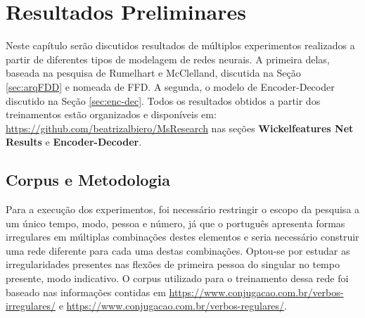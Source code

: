 \chapter{Resultados Preliminares}
\label{ch:03-results}


Neste capítulo serão discutidos resultados de múltiplos experimentos realizados a partir de diferentes tipos de modelagem de redes neurais. A primeira delas, baseada na pesquisa de Rumelhart e McClelland, discutida na Seção \ref{sec:arqFDD} e nomeada de FFD.
A segunda, o modelo de Encoder-Decoder discutido na Seção \ref{sec:enc-dec}. Todos os resultados obtidos a partir dos treinamentos estão organizados e disponíveis em: 
\url{https://github.com/beatrizalbiero/MsResearch} nas seções \textbf{Wickelfeatures Net Results} e \textbf{Encoder-Decoder}.


\section{Corpus e Metodologia}
\label{sec:corpus-ffd}

Para a execução dos experimentos, foi necessário restringir o escopo da pesquisa a um único tempo, modo, pessoa e número, já que o português apresenta formas irregulares em múltiplas combinações destes elementos e seria necessário construir uma rede diferente para cada uma destas combinações. Optou-se por estudar as irregularidades presentes nas flexões de primeira pessoa do singular no tempo presente, modo indicativo.  
O corpus utilizado para o treinamento dessa rede foi baseado nas informações contidas em \url{https://www.conjugacao.com.br/verbos-irregulares/} e \url{https://www.conjugacao.com.br/verbos-regulares/}.\\

